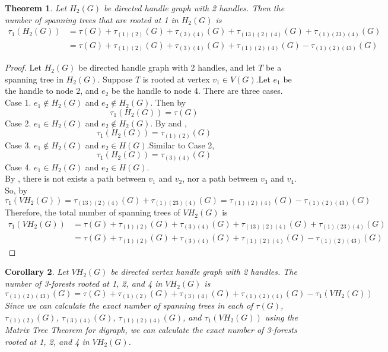 \documentclass[twoside,11pt]{article}
\newtheorem{theorem}{Theorem}[section]
\newtheorem{corollary}[theorem]{Corollary}
\numberwithin{equation}{section} \DeclareMathOperator{\Var}{Var}
\newcommand{\bpf}{\begin{proof}}
\newcommand{\epf}{\end{proof}}
\newcommand{\bcor}{\begin{corollary}}
\newcommand{\ecor}{\end{corollary}}
\newcommand{\bthm}{\begin{theorem}}
\newcommand{\ethm}{\end{theorem}}
\begin{document}
\bthm\label{DH rooted 1 }
Let $H_2(G)$ be directed handle graph with 2 handles. Then the number of spanning trees that are rooted at 1 in $H_2(G)$ is
\begin{equation*}
    \begin{split}
        \tau_1(H_2(G)) &= \tau(G)+\tau_{(1)(2)}(G)+\tau_{(3)(4)}(G)+
 \tau_{(13)(2)(4)}(G)+\tau_{(1)(23)(4)}(G)  \\
 & = \tau(G)+\tau_{(1)(2)}(G)+\tau_{(3)(4)}(G)+
 \tau_{(1)(2)(4)}(G)-\tau_{(1)(2)(43)}(G)
    \end{split}
\end{equation*}
\ethm

\bpf
Let $H_2(G)$ be directed handle graph with 2 handles, and let $T$ be a spanning tree in $H_2(G)$. Suppose $T$ is rooted at vertex $v_1\in V(G)$.Let $e_1$ be the handle to node 2, and $e_2$ be the handle to node 4. There are three cases.\\
Case 1. $e_1\notin H_2(G)$ and $e_2\notin H_2(G)$. Then by  $$\tau_1(H_2(G))=\tau(G)$$ 
Case 2. $e_1\in H_2(G)$ and $e_2\notin H_2(G)$. By  and , $$\tau_1(H_2(G)) = \tau_{(1)(2)}(G)$$
Case 3. $e_1\notin H_2(G)$ and $e_2\in H(G)$.Similar to Case 2,  $$\tau_1(H_2(G)) = \tau_{(3)(4)}(G)$$
Case 4. $e_1\in H_2(G)$ and $e_2\in H(G)$.\\
By , there is not exists a path between $v_1$ and $v_2$, nor a path between  $v_3$ and $v_4$. So, by 
$$\tau_1(VH_2(G)) = \tau_{(13)(2)(4)}(G)+\tau_{(1)(23)(4)}(G) = \tau_{(1)(2)(4)}(G)-\tau_{(1)(2)(43)}(G)$$
Therefore, the total number of spanning trees of $VH_2(G)$ is \begin{equation*}
    \begin{split}
        \tau_1(VH_2(G)) &= \tau(G)+\tau_{(1)(2)}(G)+\tau_{(3)(4)}(G)+
 \tau_{(13)(2)(4)}(G)+\tau_{(1)(23)(4)}(G)  \\
 & = \tau(G)+\tau_{(1)(2)}(G)+\tau_{(3)(4)}(G)+
 \tau_{(1)(2)(4)}(G)-\tau_{(1)(2)(43)}(G)
    \end{split}
\end{equation*}
\epf

\bcor
Let $VH_2(G)$ be directed vertex handle graph with 2 handles. The number of 3-forests rooted at 1, 2, and 4 in $VH_2(G)$ is \[
\tau_{(1)(2)(43)}(G) = \tau(G)+\tau_{(1)(2)}(G)+\tau_{(3)(4)}(G)+
 \tau_{(1)(2)(4)}(G)-\tau_1(VH_2(G))
\]
Since we can calculate the exact number of spanning trees in each of $\tau(G)$,  $\tau_{(1)(2)}(G)$, $\tau_{(3)(4)}(G)$, $\tau_{(1)(2)(4)}(G)$, and $\tau_1(VH_2(G))$ using the Matrix Tree Theorem for digraph, we can calculate the exact number of 3-forests rooted at 1, 2, and 4 in $VH_2(G)$.
\ecor
\end{document}
